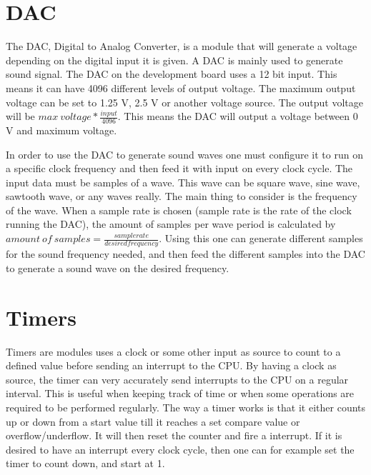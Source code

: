 \section{DAC}
The DAC, Digital to Analog Converter, is a module that will generate a voltage depending on the digital input it is given. A DAC is mainly used to generate sound signal. The DAC on the development board uses a 12 bit input. This means it can have 4096 different levels of output voltage. The maximum output voltage can be set to 1.25 V, 2.5 V or another voltage source. The output voltage will be $max\ voltage * \frac{input}{4096}$. This means the DAC will output a voltage between 0 V and maximum voltage. 

In order to use the DAC to generate sound waves one must configure it to run on a specific clock frequency and then feed it with input on every clock cycle. The input data must be samples of a wave. This wave can be square wave, sine wave, sawtooth wave, or any waves really. The main thing to consider is the frequency of the wave. When a sample rate is chosen (sample rate is the rate of the clock running the DAC), the amount of samples per wave period is calculated by $amount\ of\ samples = \frac{sample rate}{desired frequency}$. Using this one can generate different samples for the sound frequency needed, and then feed the different samples into the DAC to generate a sound wave on the desired frequency.

\section{Timers}
Timers are modules uses a clock or some other input as source to count to a defined value before sending an interrupt to the CPU. By having a clock as source, the timer can very accurately send interrupts to the CPU on a regular interval. This is useful when keeping track of time or when some operations are required to be performed regularly. The way a timer works is that it either counts up or down from a start value till it reaches a set compare value or overflow/underflow. It will then reset the counter and fire a interrupt. If it is desired to have an interrupt every clock cycle, then one can for example set the timer to count down, and start at 1. 

